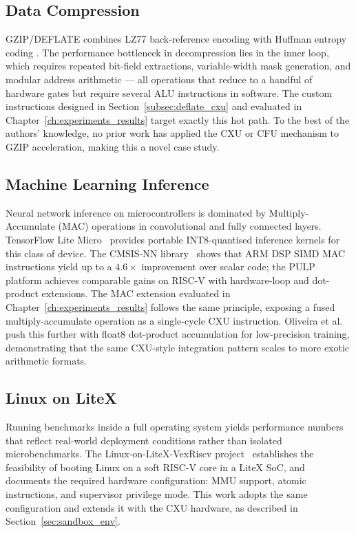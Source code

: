 \subsection{Data Compression}
\label{subsec:related_compression}

GZIP/DEFLATE combines LZ77 back-reference encoding with Huffman entropy coding
\cite{DEFLATESpec}.
The performance bottleneck in decompression lies in the inner loop, which requires
repeated bit-field extractions, variable-width mask generation, and modular address
arithmetic --- all operations that reduce to a handful of hardware gates but require
several ALU instructions in software.
The custom instructions designed in Section~\ref{subsec:deflate_cxu} and evaluated
in Chapter~\ref{ch:experiments_results} target exactly this hot path.
To the best of the authors' knowledge, no prior work has applied the CXU or CFU
mechanism to GZIP acceleration, making this a novel case study.

\subsection{Machine Learning Inference}
\label{subsec:related_ml}

Neural network inference on microcontrollers is dominated by Multiply-Accumulate (MAC)
operations in convolutional and fully connected layers.
TensorFlow Lite Micro~\cite{David2021TFLiteMicro} provides portable INT8-quantised
inference kernels for this class of device.
The CMSIS-NN library~\cite{Lai2018CMSISNN} shows that ARM DSP SIMD MAC instructions
yield up to a $4.6\times$ improvement over scalar code; the PULP platform
\cite{PULP2015} achieves comparable gains on RISC-V with hardware-loop and
dot-product extensions.
The MAC extension evaluated in Chapter~\ref{ch:experiments_results} follows the same
principle, exposing a fused multiply-accumulate operation as a single-cycle CXU
instruction.
Oliveira et al.~\cite{Oliveira2022MiniFloat} push this further with float8
dot-product accumulation for low-precision training, demonstrating that the same
CXU-style integration pattern scales to more exotic arithmetic formats.

\subsection{Linux on LiteX}
\label{subsec:related_linux_litex}

Running benchmarks inside a full operating system yields performance numbers that
reflect real-world deployment conditions rather than isolated microbenchmarks.
The Linux-on-LiteX-VexRiscv project~\cite{LinuxOnLiteXGitHub} establishes the
feasibility of booting Linux on a soft RISC-V core in a LiteX SoC, and documents
the required hardware configuration: MMU support, atomic instructions, and supervisor
privilege mode.
This work adopts the same configuration and extends it with the CXU hardware,
as described in Section~\ref{sec:sandbox_env}.

